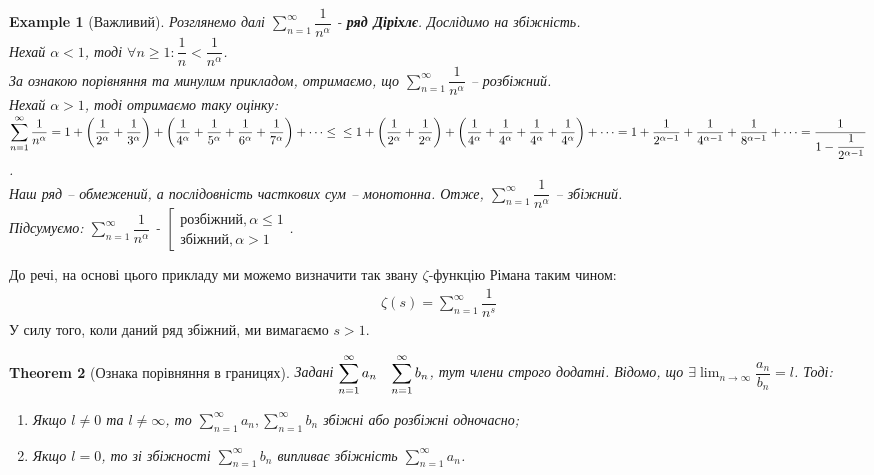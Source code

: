 \documentclass[a4paper, 10pt]{article}
\def\huge{\displaystyle}
\theoremstyle{theoremdd}
\newtheorem{theorem}{Theorem}[subsection]
\theoremstyle{theoremdd}
\theoremstyle{theoremdd}
\theoremstyle{theoremdd}
\theoremstyle{theoremdd}
\newtheorem{example}[theorem]{Example}
\theoremstyle{theoremdd}
\theoremstyle{theoremdd}
\theoremstyle{theoremdd}
\theoremstyle{theoremdd}
\begin{document}
\begin{example}[Важливий]
Розглянемо далі $\huge \sum_{n=1}^{\infty} \dfrac{1}{n^\alpha}$ - \textbf{ряд Діріхлє}. Дослідимо на збіжність.\\
Нехай $\alpha < 1$, тоді $\forall n \geq 1: \dfrac{1}{n} < \dfrac{1}{n^{\alpha}}$.\\
За ознакою порівняння та минулим прикладом, отримаємо, що $\huge \sum_{n=1}^{\infty} \dfrac{1}{n^\alpha}$ -- розбіжний.\\
Нехай $\alpha > 1$, тоді отримаємо таку оцінку:\\
$\displaystyle\sum_{n=1}^\infty \dfrac{1}{n^\alpha} = 1 + \left( \dfrac{1}{2^\alpha} + \dfrac{1}{3^\alpha} \right) + \left( \dfrac{1}{4^\alpha} + \dfrac{1}{5^\alpha} + \dfrac{1}{6^\alpha} + \dfrac{1}{7^\alpha}  \right) + \dots \leq \\
\leq 1 + \left( \dfrac{1}{2^\alpha} + \dfrac{1}{2^\alpha} \right) + \left( \dfrac{1}{4^\alpha} + \dfrac{1}{4^\alpha} + \dfrac{1}{4^\alpha} + \dfrac{1}{4^\alpha}  \right) + \dots = 1 + \dfrac{1}{2^{\alpha-1}} + \dfrac{1}{4^{\alpha-1}} + \dfrac{1}{8^{\alpha-1}} + \dots = \dfrac{1}{1-\dfrac{1}{2^{\alpha-1}}}$.\\
Наш ряд -- обмежений, а послідовність часткових сум -- монотонна. Отже, $\huge \sum_{n=1}^\infty \dfrac{1}{n^{\alpha}}$ -- збіжний.\\
Підсумуємо: $\huge \sum_{n=1}^{\infty} \dfrac{1}{n^{\alpha}}$ - $\left[ \begin{gathered} \textrm{розбіжний}, \alpha \leq 1 \\ \textrm{збіжний}, \alpha > 1   \end{gathered} \right.$.
\end{example}

\noindent До речі, на основі цього прикладу ми можемо визначити так звану $\zeta$-функцію Рімана таким чином:
\begin{align*}
\zeta(s) = \sum_{n=1}^\infty \dfrac{1}{n^s}
\end{align*}
У силу того, коли даний ряд збіжний, ми вимагаємо $s > 1$.

\begin{theorem}[Ознака порівняння в границях]
Задані $\huge \sum_{n=1}^{\infty} a_n \hspace{0.3cm} \sum_{n=1}^{\infty} b_n$, тут члени строго додатні. Відомо, що $\exists \huge \lim_{n \to \infty} \dfrac{a_n}{b_n} = l$. Тоді:
\begin{enumerate}[nosep,wide=0pt,label={\arabic*)}]
\item Якщо $l \neq 0$ та $l \neq \infty$, то $\huge \sum_{n=1}^{\infty} a_n, \sum_{n=1}^{\infty} b_n$ збіжні або розбіжні одночасно;
\item Якщо $l = 0$, то зі збіжності $\huge \sum_{n=1}^{\infty} b_n$ випливає збіжність $\huge \sum_{n=1}^{\infty} a_n$.
\end{enumerate}
\end{theorem}
\end{document}
